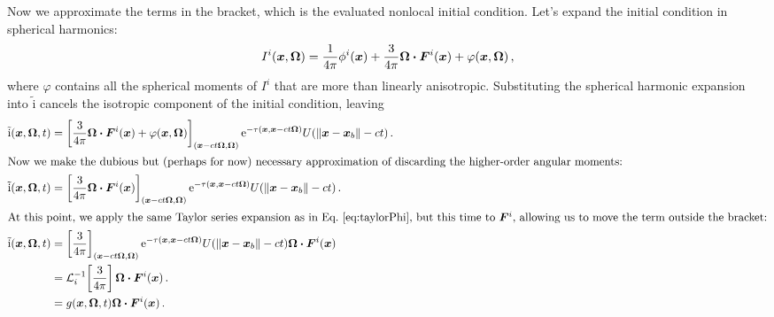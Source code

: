 Now we approximate the terms in the bracket, which is the evaluated nonlocal
initial condition. Let's expand the initial condition in spherical harmonics:
\begin{equation*}
  I^i(\bm{x}, \bm{\Omega}) = \frac{1}{4\pi} \phi^i(\bm{x})
  + \frac{3}{4\pi} \bm{\Omega} \bm{\cdot} \bm{F}^i(\bm{x}) + \varphi(\bm{x}, \bm{\Omega})\,,
\end{equation*}
where $\varphi$ contains all the spherical moments of $I^i$ that are more than
linearly anisotropic. Substituting the spherical harmonic expansion into
$\mathrm{ \tilde i }$ cancels the isotropic component of the initial condition,
leaving
\begin{align} \nonumber
  \mathrm{ \tilde i }(\bm{x}, \bm{\Omega}, t)
  &= \left[ \frac{3}{4\pi} \bm{\Omega} \bm{\cdot} \bm{F}^i(\bm{x})
  + \varphi(\bm{x}, \bm{\Omega}) \right]_{( \bm{x} - ct \bm{\Omega},
  \bm{\Omega})}
    \mathop{}\!\mathrm{e}^{ -\tau(\bm{x}, \bm{x} - ct \bm{\Omega})}
    U( \left\| \bm{x} - \bm{x}_b \right\| - ct)\,.
  \\
  \intertext{Now we make the dubious but (perhaps for now) necessary
  approximation of discarding the higher-order angular moments:} \nonumber
  \mathrm{ \tilde i }(\bm{x}, \bm{\Omega}, t)
  &= \left[ \frac{3}{4\pi} \bm{\Omega} \bm{\cdot} \bm{F}^i(\bm{x}) \right]_{( \bm{x} - ct \bm{\Omega}, \bm{\Omega})}
    \mathop{}\!\mathrm{e}^{ -\tau(\bm{x}, \bm{x} - ct \bm{\Omega})}
    U( \left\| \bm{x} - \bm{x}_b \right\| - ct)\,.
  \\
  \intertext{At this point, we apply the same Taylor series expansion as in
  Eq.~\eqref{eq:taylorPhi}, but this time to $\bm{F}^i$, allowing us to move
  the term outside the bracket:} \nonumber
  \mathrm{ \tilde i }(\bm{x}, \bm{\Omega}, t)
  &= \left[ \frac{3}{4\pi} \right]_{( \bm{x} - ct \bm{\Omega}, \bm{\Omega})}
    \mathop{}\!\mathrm{e}^{ -\tau(\bm{x}, \bm{x} - ct \bm{\Omega})}
    U( \left\| \bm{x} - \bm{x}_b \right\| - ct)  \bm{\Omega} \bm{\cdot} \bm{F}^i(\bm{x})
  \\ \nonumber
  &= \mathcal{L}_{i}^{-1}\!\left[\frac{3}{4\pi}\right] \bm{\Omega} \bm{\cdot} \bm{F}^i(\bm{x})\,.
  \\\label{eq:tildeI}
  &= g(\bm{x}, \bm{\Omega}, t) \bm{\Omega} \bm{\cdot} \bm{F}^i(\bm{x})\,.
\end{align}

